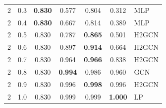 \begin{tabular}{rrccccl}
2 & 0.3 & \textbf{0.830} & 0.577 & 0.804 & 0.312 & MLP \\
2 & 0.4 & \textbf{0.830} & 0.667 & 0.814 & 0.389 & MLP \\
2 & 0.5 & 0.830 & 0.787 & \textbf{0.865} & 0.501 & H2GCN \\
2 & 0.6 & 0.830 & 0.897 & \textbf{0.914} & 0.664 & H2GCN \\
2 & 0.7 & 0.830 & 0.964 & \textbf{0.966} & 0.838 & H2GCN \\
2 & 0.8 & 0.830 & \textbf{0.994} & 0.986 & 0.960 & GCN \\
2 & 0.9 & 0.830 & 0.996 & \textbf{0.998} & 0.996 & H2GCN \\
2 & 1.0 & 0.830 & 0.999 & 0.999 & \textbf{1.000} & LP \\
\bottomrule
\end{tabular}